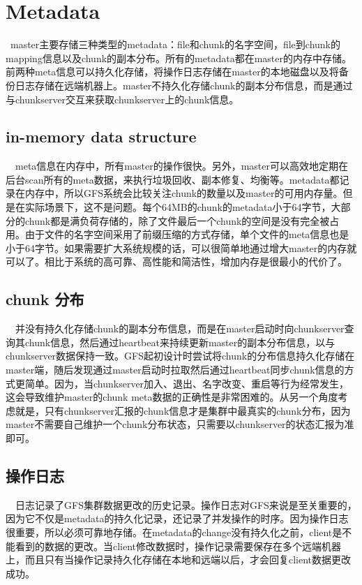 \documentclass{article}
\begin{document}
\section{Metadata}


 master主要存储三种类型的metadata：file和chunk的名字空间，file到chunk的mapping信息以及chunk的副本分布。所有的metadata都在master的内存中存储。前两种meta信息可以持久化存储，将操作日志存储在master的本地磁盘以及将备份日志存储在远端机器上。master不持久化存储chunk的副本分布信息，而是通过与chunkserver交互来获取chunkserver上的chunk信息。


\subsection{in-memory data structure}

  meta信息在内存中，所有master的操作很快。另外，master可以高效地定期在后台scan所有的meta数据，来执行垃圾回收、副本修复、均衡等。metadata都记录在内存中，所以GFS系统会比较关注chunk的数量以及master的可用内存量。但是在实际场景下，这不是问题。每个64MB的chunk的metadata小于64字节，大部分的chunk都是满负荷存储的，除了文件最后一个chunk的空间是没有完全被占用。由于文件的名字空间采用了前缀压缩的方式存储，单个文件的meta信息也是小于64字节。如果需要扩大系统规模的话，可以很简单地通过增大master的内存就可以了。相比于系统的高可靠、高性能和简洁性，增加内存是很最小的代价了。


\subsection{chunk 分布}

  并没有持久化存储chunk的副本分布信息，而是在master启动时向chunkserver查询其chunk信息，然后通过heartbeat来持续更新master的副本分布信息，以与chunkserver数据保持一致。GFS起初设计时尝试将chunk的分布信息持久化存储在master端，随后发现通过master启动时拉取然后通过heartbeat同步chunk信息的方式更简单。因为，当chunkserver加入、退出、名字改变、重启等行为经常发生，这会导致维护master的chunk meta数据的正确性是非常困难的。从另一个角度考虑就是，只有chunkserver汇报的chunk信息才是集群中最真实的chunk分布，因为master不需要自己维护一个chunk分布状态，只需要以chunkserver的状态汇报为准即可。


\subsection{操作日志}

  日志记录了GFS集群数据更改的历史记录。操作日志对GFS来说是至关重要的，因为它不仅是metadata的持久化记录，还记录了并发操作的时序。因为操作日志很重要，所以必须可靠地存储。在metadata的change没有持久化之前，client是不能看到的数据的更改。当client修改数据时，操作记录需要保存在多个远端机器上，而且只有当操作记录持久化存储在本地和远端以后，才会回复client数据更改成功。
\end{document}
